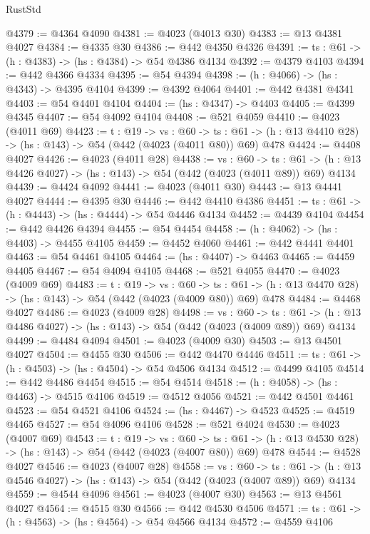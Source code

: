 \begin{lexlean}{RustStd}
\begin{coremodule}
@4379 := @4364 @4090
@4381 := @4023 (@4013 @30)
@4383 := @13 @4381 @4027
@4384 := @4335 @30
@4386 := @442 @4350 @4326
@4391 := {ts : @61} -> (h : @4383) -> (hs : @4384) -> @54 @4386 @4134
@4392 := @4379 @4103
@4394 := @442 @4366 @4334
@4395 := @54 @4394
@4398 := (h : @4066) -> (hs : @4343) -> @4395 @4104
@4399 := @4392 @4064
@4401 := @442 @4381 @4341
@4403 := @54 @4401 @4104
@4404 := (hs : @4347) -> @4403
@4405 := @4399 @4345
@4407 := @54 @4092 @4104
@4408 := @521 @4059
@4410 := @4023 (@4011 @69)
@4423 := {t : @19} ->
  {vs : @60} ->
  {ts : @61} -> (h : @13 @4410 @28) -> (hs : @143) -> @54 (@442 (@4023 (@4011 @80)) @69) @478
@4424 := @4408 @4027
@4426 := @4023 (@4011 @28)
@4438 := {vs : @60} ->
  {ts : @61} -> (h : @13 @4426 @4027) -> (hs : @143) -> @54 (@442 (@4023 (@4011 @89)) @69) @4134
@4439 := @4424 @4092
@4441 := @4023 (@4011 @30)
@4443 := @13 @4441 @4027
@4444 := @4395 @30
@4446 := @442 @4410 @4386
@4451 := {ts : @61} -> (h : @4443) -> (hs : @4444) -> @54 @4446 @4134
@4452 := @4439 @4104
@4454 := @442 @4426 @4394
@4455 := @54 @4454
@4458 := (h : @4062) -> (hs : @4403) -> @4455 @4105
@4459 := @4452 @4060
@4461 := @442 @4441 @4401
@4463 := @54 @4461 @4105
@4464 := (hs : @4407) -> @4463
@4465 := @4459 @4405
@4467 := @54 @4094 @4105
@4468 := @521 @4055
@4470 := @4023 (@4009 @69)
@4483 := {t : @19} ->
  {vs : @60} ->
  {ts : @61} -> (h : @13 @4470 @28) -> (hs : @143) -> @54 (@442 (@4023 (@4009 @80)) @69) @478
@4484 := @4468 @4027
@4486 := @4023 (@4009 @28)
@4498 := {vs : @60} ->
  {ts : @61} -> (h : @13 @4486 @4027) -> (hs : @143) -> @54 (@442 (@4023 (@4009 @89)) @69) @4134
@4499 := @4484 @4094
@4501 := @4023 (@4009 @30)
@4503 := @13 @4501 @4027
@4504 := @4455 @30
@4506 := @442 @4470 @4446
@4511 := {ts : @61} -> (h : @4503) -> (hs : @4504) -> @54 @4506 @4134
@4512 := @4499 @4105
@4514 := @442 @4486 @4454
@4515 := @54 @4514
@4518 := (h : @4058) -> (hs : @4463) -> @4515 @4106
@4519 := @4512 @4056
@4521 := @442 @4501 @4461
@4523 := @54 @4521 @4106
@4524 := (hs : @4467) -> @4523
@4525 := @4519 @4465
@4527 := @54 @4096 @4106
@4528 := @521 @4024
@4530 := @4023 (@4007 @69)
@4543 := {t : @19} ->
  {vs : @60} ->
  {ts : @61} -> (h : @13 @4530 @28) -> (hs : @143) -> @54 (@442 (@4023 (@4007 @80)) @69) @478
@4544 := @4528 @4027
@4546 := @4023 (@4007 @28)
@4558 := {vs : @60} ->
  {ts : @61} -> (h : @13 @4546 @4027) -> (hs : @143) -> @54 (@442 (@4023 (@4007 @89)) @69) @4134
@4559 := @4544 @4096
@4561 := @4023 (@4007 @30)
@4563 := @13 @4561 @4027
@4564 := @4515 @30
@4566 := @442 @4530 @4506
@4571 := {ts : @61} -> (h : @4563) -> (hs : @4564) -> @54 @4566 @4134
@4572 := @4559 @4106

\end{coremodule}
\end{lexlean}
